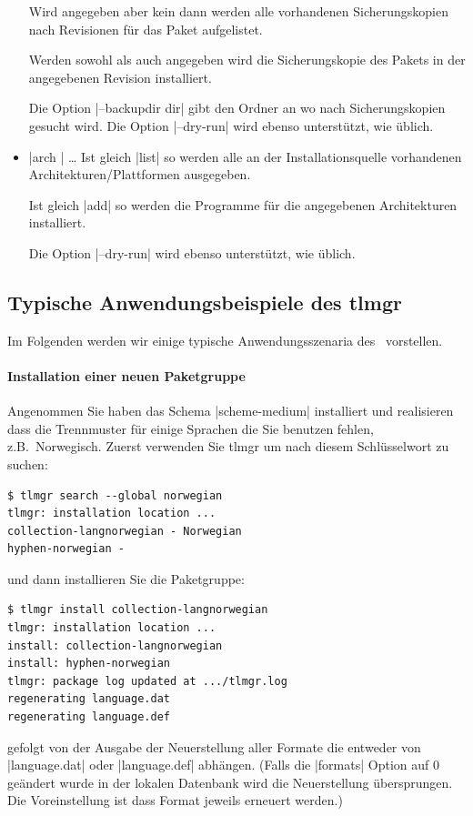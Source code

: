 \begin{itemize}
  Wird  angegeben aber kein  dann werden alle 
  vorhandenen Sicherungskopien nach Revisionen für das Paket
  aufgelistet.

  Werden sowohl  als auch  angegeben wird die 
  Sicherungskopie des Pakets in der angegebenen Revision installiert.

  Die Option |--backupdir dir| gibt den Ordner an wo nach 
  Sicherungskopien gesucht wird.
  Die Option |--dry-run| wird ebenso unterstützt, wie üblich.
  
\item |arch | \ldots
  Ist  gleich |list| so werden alle an der 
  Installationsquelle vorhandenen Architekturen/Plattformen ausgegeben.
  
  Ist  gleich |add| so werden die Programme für die 
  angegebenen Architekturen installiert.
  
  Die Option |--dry-run| wird ebenso unterstützt, wie üblich.
\end{itemize}


\subsection{Typische Anwendungsbeispiele des tlmgr}

Im Folgenden werden wir einige typische Anwendungsszenaria des \tlmgr\
vorstellen.

\paragraph{Installation einer neuen Paketgruppe}

Angenommen Sie haben das Schema |scheme-medium| installiert und
realisieren dass die Trennmuster für einige Sprachen die Sie benutzen
fehlen, z.B.\ Norwegisch. Zuerst verwenden Sie tlmgr um nach diesem
Schlüsselwort zu suchen:
\begin{lstlisting}
$ tlmgr search --global norwegian
tlmgr: installation location ...
collection-langnorwegian - Norwegian
hyphen-norwegian - 
\end{lstlisting}
und dann installieren Sie die Paketgruppe:
\begin{lstlisting}
$ tlmgr install collection-langnorwegian
tlmgr: installation location ...
install: collection-langnorwegian
install: hyphen-norwegian
tlmgr: package log updated at .../tlmgr.log
regenerating language.dat
regenerating language.def
\end{lstlisting}
gefolgt von der Ausgabe der Neuerstellung aller Formate die entweder von
|language.dat| oder |language.def| abhängen.
(Falls die |formats| Option auf 0 geändert wurde in der lokalen Datenbank
wird die Neuerstellung übersprungen. Die Voreinstellung ist dass Format
jeweils erneuert werden.)

